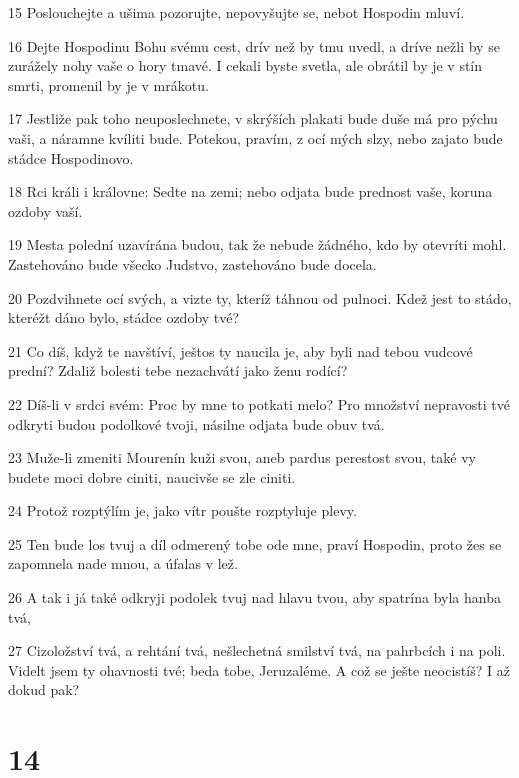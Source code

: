 \par 15 Poslouchejte a ušima pozorujte, nepovyšujte se, nebot Hospodin mluví.
\par 16 Dejte Hospodinu Bohu svému cest, drív než by tmu uvedl, a dríve nežli by se zurážely nohy vaše o hory tmavé. I cekali byste svetla, ale obrátil by je v stín smrti, promenil by je v mrákotu.
\par 17 Jestliže pak toho neuposlechnete, v skrýších plakati bude duše má pro pýchu vaši, a náramne kvíliti bude. Potekou, pravím, z ocí mých slzy, nebo zajato bude stádce Hospodinovo.
\par 18 Rci králi i královne: Sedte na zemi; nebo odjata bude prednost vaše, koruna ozdoby vaší.
\par 19 Mesta polední uzavírána budou, tak že nebude žádného, kdo by otevríti mohl. Zastehováno bude všecko Judstvo, zastehováno bude docela.
\par 20 Pozdvihnete ocí svých, a vizte ty, kteríž táhnou od pulnoci. Kdež jest to stádo, kteréžt dáno bylo, stádce ozdoby tvé?
\par 21 Co díš, když te navštíví, ještos ty naucila je, aby byli nad tebou vudcové prední? Zdaliž bolesti tebe nezachvátí jako ženu rodící?
\par 22 Díš-li v srdci svém: Proc by mne to potkati melo? Pro množství nepravosti tvé odkryti budou podolkové tvoji, násilne odjata bude obuv tvá.
\par 23 Muže-li zmeniti Mourenín kuži svou, aneb pardus perestost svou, také vy budete moci dobre ciniti, naucivše se zle ciniti.
\par 24 Protož rozptýlím je, jako vítr poušte rozptyluje plevy.
\par 25 Ten bude los tvuj a díl odmerený tobe ode mne, praví Hospodin, proto žes se zapomnela nade mnou, a úfalas v lež.
\par 26 A tak i já také odkryji podolek tvuj nad hlavu tvou, aby spatrína byla hanba tvá,
\par 27 Cizoložství tvá, a rehtání tvá, nešlechetná smilství tvá, na pahrbcích i na poli. Videlt jsem ty ohavnosti tvé; beda tobe, Jeruzaléme. A což se ješte neocistíš? I až dokud pak?

\chapter{14}

